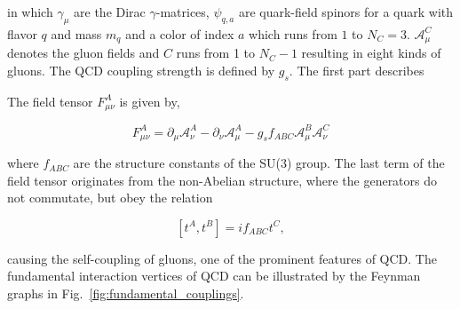 in which $\gamma_\mu$ are the Dirac $\gamma$-matrices, $\psi_{q,a}$ are
quark-field spinors for a quark with flavor $q$ and mass $m_q$ and a color of
index $a$ which runs from $1$ to $N_C=3$. $\mathcal{A}_\mu^C$ denotes the gluon
fields and $C$ runs from 1 to $N_C-1$ resulting in eight kinds of gluons. The
QCD coupling strength is defined by $g_s$. The first part describes

The field tensor $F_{\mu\nu}^A$ is given by, 

\begin{equation*}
    F_{\mu\nu}^A = \partial_\mu \mathcal{A}_\nu^A - \partial_{\nu}
    \mathcal{A}_{\mu}^A - g_s f_{ABC} \mathcal{A}_{\mu}^B
    \mathcal{A}_{\nu}^C
\end{equation*}

where $f_{ABC}$ are the structure constants of the SU(3) group. The last term of
the field tensor originates from the non-Abelian structure,  where the generators
do not commutate, but obey the relation

\begin{equation*}
    \left[t^A, t^B \right] = if_{ABC} t^{C},
\end{equation*}

causing the self-coupling of gluons, one of the prominent features of QCD. The
fundamental interaction vertices of QCD can be illustrated by the Feynman graphs
in Fig.~\ref{fig:fundamental_couplings}.


